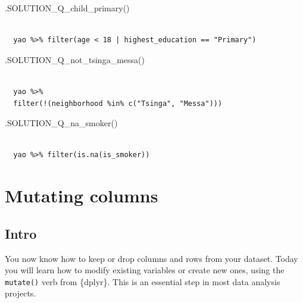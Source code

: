 \documentclass[
  letterpaper,
  DIV=11,
  numbers=noendperiod]{scrreprt}
\newenvironment{Shaded}{\begin{snugshade}}{\end{snugshade}}
\newcommand{\FunctionTok}[1]{\textcolor[rgb]{0.28,0.35,0.67}{#1}}
\newcommand{\NormalTok}[1]{\textcolor[rgb]{0.00,0.23,0.31}{#1}}
\begin{document}
\begin{Shaded}
\begin{Highlighting}[]
\FunctionTok{.SOLUTION\_Q\_child\_primary}\NormalTok{()}
\end{Highlighting}
\end{Shaded}

\begin{verbatim}
 
  yao %>% filter(age < 18 | highest_education == "Primary")
\end{verbatim}

\begin{Shaded}
\begin{Highlighting}[]
\FunctionTok{.SOLUTION\_Q\_not\_tsinga\_messa}\NormalTok{()}
\end{Highlighting}
\end{Shaded}

\begin{verbatim}
 
  yao %>%
  filter(!(neighborhood %in% c("Tsinga", "Messa")))
\end{verbatim}

\begin{Shaded}
\begin{Highlighting}[]
\FunctionTok{.SOLUTION\_Q\_na\_smoker}\NormalTok{()}
\end{Highlighting}
\end{Shaded}

\begin{verbatim}
 
  yao %>% filter(is.na(is_smoker))
\end{verbatim}


\hypertarget{mutating-columns}{%
\chapter{Mutating columns}\label{mutating-columns}}

\hypertarget{intro-1}{%
\section{Intro}\label{intro-1}}

You now know how to keep or drop columns and rows from your dataset.
Today you will learn how to modify existing variables or create new
ones, using the \texttt{mutate()} verb from \{dplyr\}. This is an
essential step in most data analysis projects.
\end{document}
